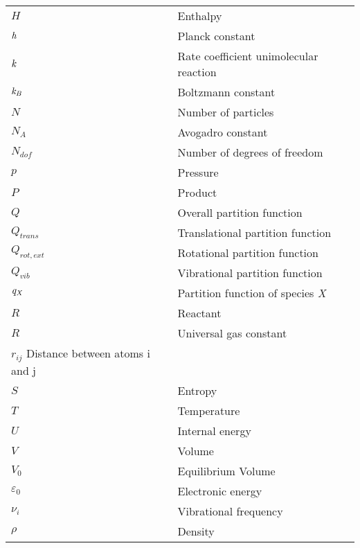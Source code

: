 \begin{longtable}{p{} p{}}
$ H $ & Enthalpy\\
$\it{h}$ & Planck constant\\
$ \it{k} $ & Rate coefficient unimolecular reaction\\ 
$ \it{k}_{B} $ & Boltzmann constant\\
$ N $ & Number of particles\\
$ N_{A} $ & Avogadro constant \\
$ N_{dof} $ & Number of degrees of freedom \\
$ p $ & Pressure\\
$ P $ & Product \\
$ Q $ & Overall partition function\\
$ Q_{trans} $ & Translational partition function \\
$ Q_{rot,ext} $ & Rotational partition function \\
$ Q_{vib} $ & Vibrational partition function \\
$ \it{q_X} $ & Partition function of species \it{X}\\
$ R $ & Reactant \\
$ R $ & Universal gas constant \\
$ r_{ij} $ Distance between atoms i and j\\
$ S $ & Entropy\\
$ T $ & Temperature \\
$ U $ & Internal energy\\
$ V $ & Volume\\
$ V_0 $ & Equilibrium Volume\\
$ \varepsilon_0 $ & Electronic energy \\
$\nu_{i}$ & Vibrational frequency \\ 
$ \rho $ & Density\\ \hline

\end{longtable}

